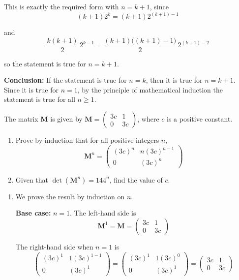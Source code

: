 \documentclass[leqno]{article}
\begin{document}
\begin{enumerate}[
  label=\textbf{\arabic*.},
  leftmargin=*,
  topsep=0pt,
  partopsep=0pt,
  parsep=0pt
]
\begin{djsSolution}
This is exactly the required form with \(n=k+1\), since
\[
(k+1)2^k=(k+1)2^{(k+1)-1}
\]

and
\[
\frac{k(k+1)}{2}\,2^{k-1}
=
\frac{(k+1)\bigl((k+1)-1\bigr)}{2}\,2^{(k+1)-2}
\]

so the statement is true for \(n=k+1\).

\textbf{Conclusion:} If the statement is true for \(n=k\), then it is true for \(n=k+1\). Since it is true for \(n=1\), by the principle of mathematical induction the statement is true for all \(n\geq 1\).
\end{djsSolution}


\newpage

\questionitem

The matrix $\mathbf{M}$ is given by $\mathbf{M} = \begin{pmatrix}3c & 1 \\ 0 & 3c\end{pmatrix}$, where $c$ is a positive constant. \\
\begin{enumerate}[label=\textbf{(\alph*)}]
  \item Prove by induction that for all positive integers $n$,
  \[
  \mathbf{M}^n = \begin{pmatrix}(3c)^n & n(3c)^{n-1} \\ 0 & (3c)^n\end{pmatrix}
  \]
  \item Given that $\det(\mathbf{M}^n) = 144^n$, find the value of $c$.  \\
\end{enumerate}

\vspace*{10pt}

\begin{djsSolution}
\begin{enumerate}[label=\textbf{(\alph*)}]
  \item We prove the result by induction on $n$.

  \textbf{Base case:} $n=1$. The left-hand side is
  \[
  \mathbf{M}^1=\mathbf{M}=\begin{pmatrix}3c&1\\0&3c\end{pmatrix}
  \]

  The right-hand side when $n=1$ is
  \[
  \begin{pmatrix}(3c)^1 & 1(3c)^{1-1}\\0&(3c)^1\end{pmatrix}
  =
  \begin{pmatrix}(3c)^1 & 1(3c)^0\\0&(3c)^1\end{pmatrix}
  =
  \begin{pmatrix}3c&1\\0&3c\end{pmatrix}
  \]


\end{enumerate}
\end{djsSolution}
\end{enumerate}
\end{document}
